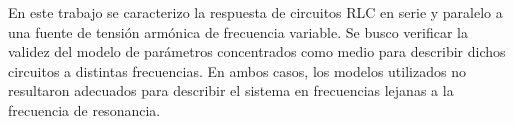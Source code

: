 En este trabajo se caracterizo la respuesta de circuitos RLC en serie y paralelo a una fuente de tensión armónica de frecuencia variable. Se busco verificar la validez del modelo de parámetros concentrados como medio para describir dichos circuitos a distintas frecuencias. En ambos casos, los modelos utilizados no resultaron adecuados para describir el sistema en frecuencias lejanas a la frecuencia de resonancia.